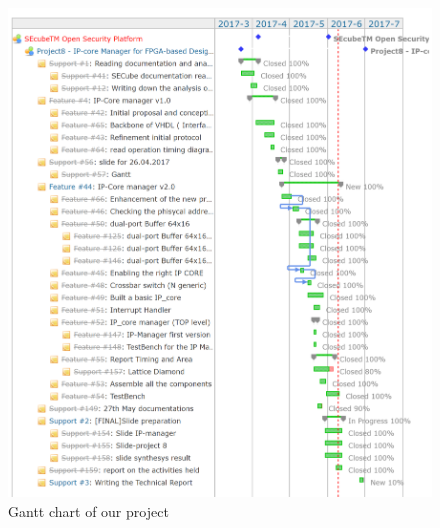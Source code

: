 \begin{figure}[h!]
	\centering	
	\includegraphics[height=0.65 \textheight]{chapters/gantt.png}  
	\caption{Gantt chart of our project} 
	\label{gantt}
\end{figure}	